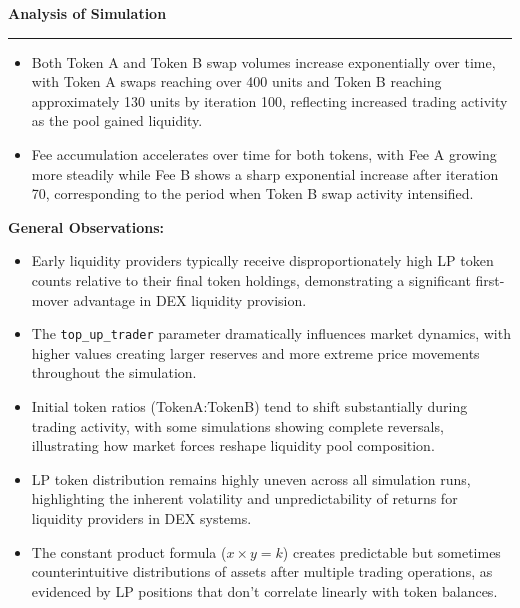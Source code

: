 \documentclass[a4paper]{article}
\newenvironment{solution}[2][]{%
\begin{mdframed}[linecolor=blue!70!black, linewidth=2pt, roundcorner=10pt, backgroundcolor=yellow!10!white, skipabove=12pt, skipbelow=12pt]%
	\textbf{\large #2}
	\par\noindent\rule{\textwidth}{0.4pt}
}{
\end{mdframed}
}
\begin{document}
\begin{solution}{Analysis of Simulation}
\begin{itemize}
\begin{itemize}
	\item Both Token A and Token B swap volumes increase exponentially over time, with Token A swaps reaching over 400 units and Token B reaching approximately 130 units by iteration 100, reflecting increased trading activity as the pool gained liquidity.

	\item Fee accumulation accelerates over time for both tokens, with Fee A growing more steadily while Fee B shows a sharp exponential increase after iteration 70, corresponding to the period when Token B swap activity intensified.
  \end{itemize}
  

\end{itemize}

\clearpage
\textbf{General Observations:}
\begin{itemize}
	\item Early liquidity providers typically receive disproportionately high LP token counts relative to their final token holdings, demonstrating a significant first-mover advantage in DEX liquidity provision.
	\item The \texttt{top\_up\_trader} parameter dramatically influences market dynamics, with higher values creating larger reserves and more extreme price movements throughout the simulation.

	\item Initial token ratios (TokenA:TokenB) tend to shift substantially during trading activity, with some simulations showing complete reversals, illustrating how market forces reshape liquidity pool composition.
	
	\item LP token distribution remains highly uneven across all simulation runs, highlighting the inherent volatility and unpredictability of returns for liquidity providers in DEX systems.
	
	\item The constant product formula ($x \times y = k$) creates predictable but sometimes counterintuitive distributions of assets after multiple trading operations, as evidenced by LP positions that don't correlate linearly with token balances.
\end{itemize}
\end{solution}
\end{document}
